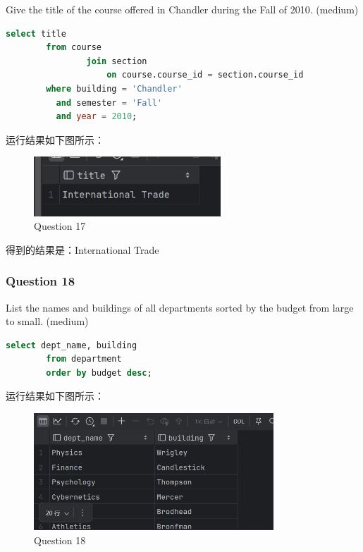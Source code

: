 \documentclass{article}
\begin{document}
    Give the title of the course offered in Chandler during the Fall of 2010.  (medium)
    
    \begin{lstlisting}[language=sql, title=Question 17, tabsize=4]
    	select title
    	from course
    			join section
    				on course.course_id = section.course_id
    	where building = 'Chandler'
    	  and semester = 'Fall'
    	  and year = 2010;
    \end{lstlisting}
    
    运行结果如下图所示：
    
    \begin{figure}[H]
    	\centering
    	\includegraphics[width=7cm]{./images/21.Question17.png}
    	\caption{Question 17}
    \end{figure}
    
    得到的结果是：International Trade
    
    \subsubsection{Question 18}
    
    List the names and buildings of all departments sorted by the budget from large to small. (medium)
    
    \begin{lstlisting}[language=sql, title=Question 18, tabsize=4]
    	select dept_name, building
    	from department
    	order by budget desc;
    \end{lstlisting}
    
    运行结果如下图所示：
    
    \begin{figure}[H]
    	\centering
    	\includegraphics[width=9cm]{./images/22.Question18.png}
    	\caption{Question 18}
    \end{figure}
    
\end{document}
